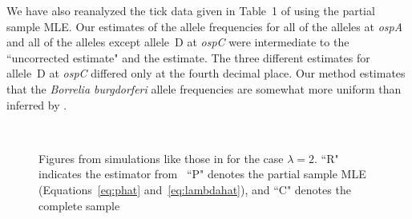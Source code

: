 \documentclass[12pt,titlepage]{article}
\begin{document}
We have also reanalyzed the tick data given in Table~1 of  using
the partial sample MLE.  Our estimates of the allele frequencies for all of the
alleles at {\em ospA} and all of the alleles except allele~D at {\em ospC} were
intermediate to the ``uncorrected estimate" and the 
estimate.  The three different estimates for allele~D at {\em ospC} differed only at
the fourth decimal place.  Our method estimates that the {\em Borrelia burgdorferi}
allele frequencies are somewhat more uniform than inferred by .

\begin{figure}
\begin{center}
\mbox{
 \hspace*{.1\textwidth}
}
\end{center}
\caption{Figures from simulations like those in \protect{} for the
case
$\lambda = 2$.  ``R" indicates the estimator from
\protect{}\  ``P" denotes the partial sample MLE
(Equations~\ref{eq:phat} and~\ref{eq:lambdahat}), and ``C" denotes the complete sample
}
\end{figure}
\end{document}
